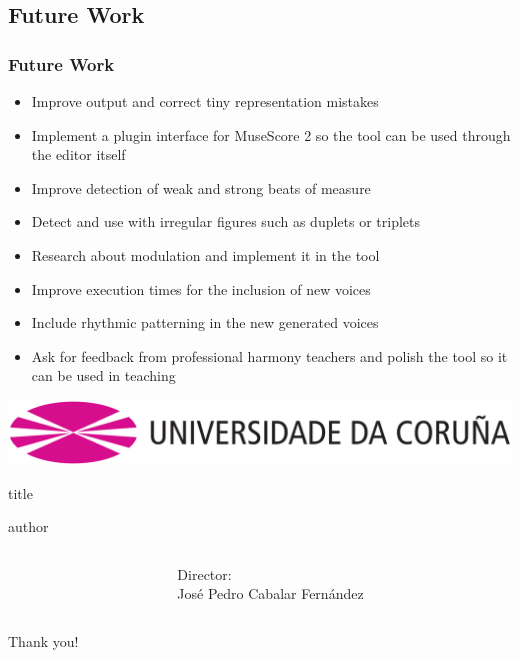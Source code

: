 \documentclass[english]{beamer}
\newcommand{\director}{Director:\\José Pedro Cabalar Fernández}
\begin{document}
\subsection{Future Work}
	\begin{frame}
		\frametitle{Future Work}
		\begin{itemize}
			\item Improve output and correct tiny representation mistakes
			\item Implement a plugin interface for MuseScore 2 so the tool can be used through the editor itself
			\item Improve detection of weak and strong beats of measure
			\item Detect and use with irregular figures such as duplets or triplets
			\item Research about modulation and implement it in the tool
			\item Improve execution times for the inclusion of new voices
			\item Include rhythmic patterning in the new generated voices
			\item Ask for feedback from professional harmony teachers and polish the tool so it can be used in teaching
		\end{itemize}
	\end{frame}
		
\begin{frame}
\centering
\vfill
\includegraphics[width=0.6\linewidth]{imagenes/anagramaUDC.png}
\vfill
\begin{beamercolorbox}[rounded=true,shadow=true,sep=8pt,center]{title}
\inserttitle \par
\end{beamercolorbox}
\vfill
\begin{beamercolorbox}[leftskip=8cm,center,wd=0.7\textwidth]{author}
\begin{columns}[T]
\begin{column}{.49\textwidth}%
\centering
\insertauthor
\end{column}
\begin{column}{.49\textwidth}%
\centering
\director
\end{column}
\end{columns}
\end{beamercolorbox}
\centering
\vfill
Thank you!
\vfill
\insertdate\par
\vfill
\end{frame}
\end{document}
